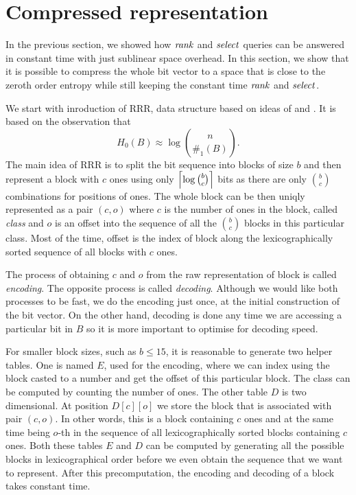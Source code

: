 \section{Compressed representation}
\label{section:compressed_bv}

In the previous section, we showed how $\mathit{rank}$ and $\mathit{select}$ queries can be answered in constant
time with just sublinear space overhead. In this section, we show that it is possible to compress
the whole bit vector to a space that is close to the zeroth order entropy while still keeping the
constant time $\mathit{rank}$ and $\mathit{select}$.

We start with inroduction of RRR, data structure based on ideas of \cite{pagh2001low} and \cite{raman2007succinct}.
It is based on the observation that $$H_0(B)\approx \log {n \choose \#_1(B)}.$$ The main idea of RRR is to
split the bit sequence into blocks of size $b$ and then represent a block with $c$ ones using only
$\left\lceil \log {b \choose c} \right\rceil$ bits as there are only ${b \choose c}$ combinations for positions of ones.
The whole block can be then uniqly represented as a pair $(c, o)$ where $c$ is the number of ones in the
block, called \emph{class} and $o$ is an offset into the sequence of all the ${b \choose c}$ blocks
in this particular class. Most of the time, offset is the index of block along the lexicographically
sorted sequence of all blocks with $c$ ones.

The process of obtaining $c$ and $o$ from the raw representation of block is called
\textit{encoding}. The opposite process is called \textit{decoding}. Although we would
like both processes to be fast, we do the encoding just once, at the initial construction
of the bit vector. On the other hand, decoding is done any time we are accessing a particular
bit in $B$ so it is more important to optimise for decoding speed.

For smaller block sizes, such as $b\leq 15$, it is reasonable to
generate two helper tables. One is named $E$, used for the encoding, where we can
index using the block casted to a number and get the offset of this particular block.
The class can be computed by counting the number of ones. The other table
$D$ is two dimensional. At position $D[c][o]$ we store the block that
is associated with pair $(c, o)$. In other words, this is a block containing $c$ ones
and at the same time being $o$-th in the sequence of all lexicographically sorted
blocks containing $c$ ones. Both these tables $E$ and $D$ can be computed
by generating all the possible blocks in lexicographical order before we even
obtain the sequence that we want to represent. After this precomputation,
the encoding and decoding of a block takes constant time.

